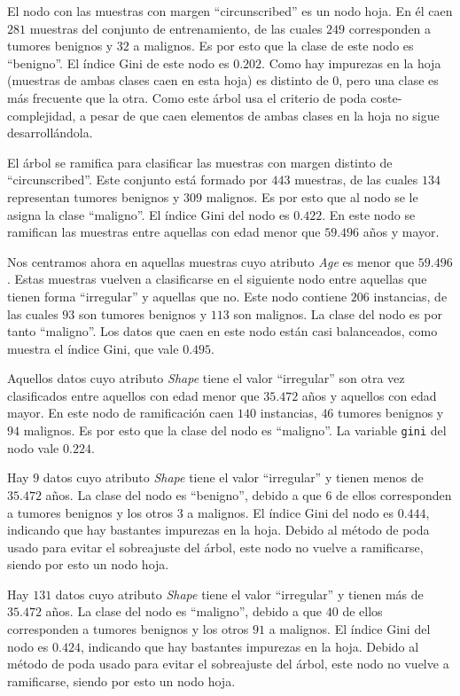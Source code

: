 \documentclass[a4]{article}
\begin{document}
El nodo con las muestras con margen ``circunscribed'' es un nodo hoja. En él caen $281$ muestras del conjunto de entrenamiento, de las cuales $249$ corresponden a tumores  benignos y $32$ a malignos. Es por esto que la clase de este nodo es ``benigno''. El índice Gini de este nodo es $0.202$. Como hay impurezas en la hoja (muestras de ambas clases caen en esta hoja) es distinto de $0$, pero una clase es más frecuente que la otra. Como este árbol usa el criterio de poda coste-complejidad, a pesar de que caen elementos de ambas clases en la hoja no sigue desarrollándola.

El árbol se ramifica para clasificar las muestras con margen distinto de ``circunscribed''. Este conjunto está formado por $443$ muestras, de las cuales $134$ representan tumores benignos y $309$ malignos. Es por esto que al nodo se le asigna la clase ``maligno''. El índice Gini del nodo es $0.422$. En este nodo se ramifican las muestras entre aquellas con edad menor que $59.496$ años y mayor.

Nos centramos ahora en aquellas muestras cuyo atributo \textit{Age} es menor que $59.496$. Estas muestras vuelven a clasificarse en el siguiente nodo entre aquellas que tienen forma ``irregular'' y aquellas que no. Este nodo contiene $206$ instancias, de las cuales $93$ son tumores benignos y $113$ son malignos. La clase del nodo es por tanto ``maligno''. Los datos que caen en este nodo están casi balanceados, como muestra el índice Gini, que vale $0.495$.

Aquellos datos cuyo atributo \textit{Shape} tiene el valor ``irregular'' son otra vez clasificados entre aquellos con edad menor que $35.472$ años y aquellos con edad mayor. En este nodo de ramificación caen $140$ instancias, $46$ tumores benignos y $94$ malignos. Es por esto que la clase del nodo es ``maligno''. La variable \texttt{gini} del nodo vale $0.224$.

Hay $9$ datos cuyo atributo \textit{Shape} tiene el valor ``irregular'' y tienen menos de $35.472$ años. La clase del nodo es ``benigno'', debido a que $6$ de ellos corresponden a tumores benignos y los otros $3$ a malignos. El índice Gini del nodo es $0.444$, indicando que hay bastantes impurezas en la hoja. Debido al método de poda usado para evitar el sobreajuste del árbol, este nodo no vuelve a ramificarse, siendo por esto un nodo hoja.

Hay $131$ datos cuyo atributo \textit{Shape} tiene el valor ``irregular'' y tienen más de $35.472$ años. La clase del nodo es ``maligno'', debido a que $40$ de ellos corresponden a tumores benignos y los otros $91$ a malignos. El índice Gini del nodo es $0.424$, indicando que hay bastantes impurezas en la hoja. Debido al método de poda usado para evitar el sobreajuste del árbol, este nodo no vuelve a ramificarse, siendo por esto un nodo hoja.
\end{document}
